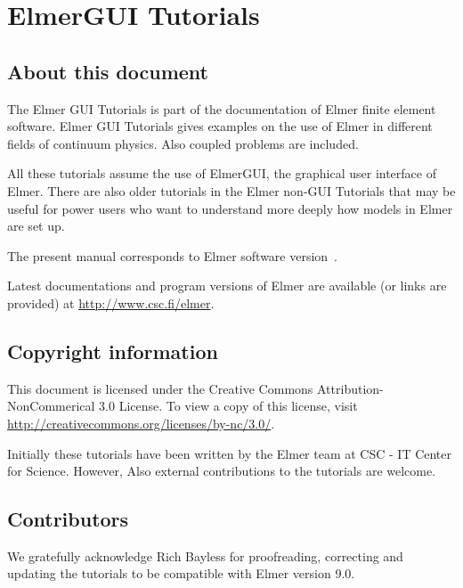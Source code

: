 \chapter*{ElmerGUI Tutorials}

\section*{About this document}

The Elmer GUI Tutorials is part of the documentation of Elmer finite element software.
Elmer GUI Tutorials gives examples on the use of Elmer in different fields
of continuum physics. Also coupled problems are included. 

All these tutorials assume the use of ElmerGUI, the graphical user interface of 
Elmer. There are also older tutorials in the Elmer non-GUI Tutorials that 
may be useful for power users who want to understand more deeply 
how models in Elmer are set up.

The present manual corresponds to Elmer software version~\elmerversion{}.

Latest documentations and program versions of Elmer are available (or links are provided) at 
\url{http://www.csc.fi/elmer}. 

\section*{Copyright information}

This document is licensed under the Creative Commons Attribution-NonCommerical 3.0 License. 
To view a copy of this license, visit \url{http://creativecommons.org/licenses/by-nc/3.0/}.

Initially these tutorials have been written by the Elmer team at CSC - IT Center for Science.
However, Also external contributions to the tutorials are welcome.

\section*{Contributors}

We gratefully acknowledge Rich Bayless for proofreading, correcting and 
updating the tutorials to be compatible with Elmer version 9.0. 

